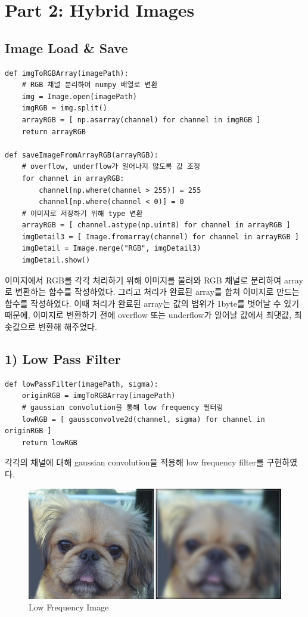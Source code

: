 \documentclass[]{report}
\begin{document}
\section{Part 2: Hybrid Images}

\subsection*{Image Load \& Save}
\begin{lstlisting}
def imgToRGBArray(imagePath):
	# RGB 채널 분리하여 numpy 배열로 변환
	img = Image.open(imagePath)
	imgRGB = img.split()
	arrayRGB = [ np.asarray(channel) for channel in imgRGB ]
	return arrayRGB

def saveImageFromArrayRGB(arrayRGB):
	# overflow, underflow가 일어나지 않도록 값 조정
	for channel in arrayRGB:
		channel[np.where(channel > 255)] = 255
		channel[np.where(channel < 0)] = 0
	# 이미지로 저장하기 위해 type 변환
	arrayRGB = [ channel.astype(np.uint8) for channel in arrayRGB ]
	imgDetail3 = [ Image.fromarray(channel) for channel in arrayRGB ]
	imgDetail = Image.merge("RGB", imgDetail3)
	imgDetail.show()
\end{lstlisting}
이미지에서 RGB를 각각 처리하기 위해 이미지를 불러와 RGB 채널로 분리하여 array로 변환하는 함수를 작성하였다. 그리고 처리가 완료된 array를 합쳐 이미지로 만드는 함수를 작성하였다. 이때 처리가 완료된 array는 값의 범위가 1byte를 벗어날 수 있기 때문에, 이미지로 변환하기 전에 overflow 또는 underflow가 일어날 값에서 최댓값, 최솟값으로 변환해 해주었다. \\

\subsection*{1) Low Pass Filter}

\begin{lstlisting}
def lowPassFilter(imagePath, sigma):
	originRGB = imgToRGBArray(imagePath)
	# gaussian convolution을 통해 low frequency 필터링
	lowRGB = [ gaussconvolve2d(channel, sigma) for channel in originRGB ]
	return lowRGB
\end{lstlisting}
각각의 채널에 대해 gaussian convolution을 적용해 low frequency filter를 구현하였다. \\

\begin{figure}[ht!]
	\centering
	\includegraphics[width=1\textwidth]{image/lowFrequencyDog.jpg}
	\caption{Low Frequency Image}
	\label{lowFrequencyDog}
\end{figure} 
\end{document}
